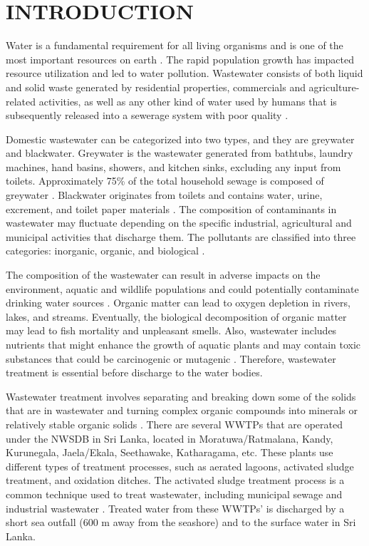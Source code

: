 \newpage
{}
\section{INTRODUCTION}
Water is a fundamental requirement for all living organisms and is one of the most important resources on earth \cite{Smarzewska2021}. The rapid population growth has impacted resource utilization and led to water pollution. Wastewater consists of both liquid and solid waste generated by residential properties,
commercials and agriculture-related activities, as well as any other kind of water used by humans that is subsequently released into a sewerage system
with poor quality \cite{Prasad2020}.

Domestic wastewater can be categorized into two types, and they are greywater and blackwater. Greywater is the wastewater generated from bathtubs, laundry machines, hand basins, showers, and kitchen sinks, excluding any input from toilets. Approximately 75\% of the total household sewage is composed of greywater \cite{Eriksson2002}. Blackwater originates from toilets and contains water, urine, excrement, and toilet paper materials \cite{Paulo2013}. The composition of contaminants in wastewater may fluctuate depending on the specific industrial,
agricultural and municipal activities that discharge them. The pollutants are classified into three categories: inorganic, organic, and biological \cite{Sangeetha2023}.

The composition of the wastewater can result in adverse impacts on the environment, aquatic and wildlife populations and could potentially contaminate drinking water sources \cite{Smarzewska2021}. Organic matter can lead to oxygen depletion in rivers, lakes, and streams. Eventually, the biological decomposition of organic matter may lead to fish mortality and unpleasant smells. Also, wastewater includes nutrients that might enhance the growth of aquatic plants and may contain toxic substances that could be carcinogenic or mutagenic \cite{Prasad2020}. Therefore, wastewater treatment is essential before discharge to the water bodies.

Wastewater treatment involves separating and breaking down some of the solids that are in wastewater and turning complex organic compounds into minerals or relatively stable organic solids \cite{Sonune2004}. There are several \ac{WWTP}s that are operated under the \ac{NWSDB} in Sri Lanka, located in Moratuwa/Ratmalana, Kandy, Kurunegala, Jaela/Ekala, Seethawake, Katharagama, etc. These plants use different types of treatment processes, such as aerated lagoons, activated sludge treatment, and oxidation ditches. The activated sludge treatment process is a common technique used to treat wastewater, including municipal sewage and industrial wastewater \cite{AGUILAR2013, Chukwu2018}. Treated water from these \ac{WWTP}s' is discharged by a short sea outfall (600 m away from the seashore) and to the surface water in Sri Lanka.

